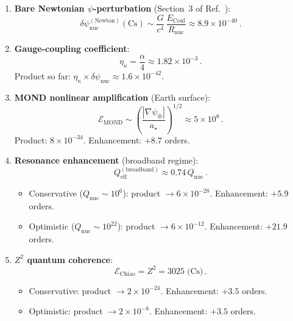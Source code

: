 \documentclass[aps,prd,twocolumn,superscriptaddress,nofootinbib]{revtex4-2}
\newcommand{\astar}{a_\star}
\newcommand{\ee}[1]{\times 10^{#1}}
\newcommand{\kap}{\kappa}
\newcommand{\dpsi}{\delta\psi}
\newcommand{\Qnuc}{Q_{\mathrm{nuc}}}
\newcommand{\Rnuc}{R_{\mathrm{nuc}}}
\newcommand{\Ecoul}{E_{\mathrm{Coul}}}
\begin{document}
\begin{enumerate}[label=\arabic*.]
\item \textbf{Bare Newtonian $\psi$-perturbation} (Section~3 of
Ref.~\cite{Alcock2026VS}):
\begin{equation}
\dpsi_{\mathrm{nuc}}^{(\mathrm{Newton})}(\mathrm{Cs})
\sim \frac{G}{c^4}\,\frac{\Ecoul}{\Rnuc}
\approx 8.9\ee{-40}\,.
\end{equation}

\item \textbf{Gauge-coupling coefficient}:
\begin{equation}
\eta_\kap = \frac{\alpha}{4} \approx 1.82\ee{-3}\,.
\end{equation}
Product so far: $\eta_\kap \times \dpsi_{\mathrm{nuc}} \approx
1.6\ee{-42}$.

\item \textbf{MOND nonlinear amplification} (Earth surface):
\begin{equation}
\mathcal{E}_{\mathrm{MOND}} \sim
\left(\frac{|\nabla\psi_\oplus|}{\astar}\right)^{1/2}
\approx 5\ee{8}\,.
\end{equation}
Product: $8\ee{-34}$.  Enhancement: $+8.7$ orders.

\item \textbf{Resonance enhancement} (broadband regime):
\begin{equation}
Q_{\mathrm{eff}}^{(\mathrm{broadband})} \approx 0.74\,\Qnuc\,.
\end{equation}
\begin{itemize}[nosep]
\item Conservative ($\Qnuc \sim 10^6$): product $\rightarrow 6\ee{-28}$.
Enhancement: $+5.9$ orders.
\item Optimistic ($\Qnuc \sim 10^{22}$): product $\rightarrow 6\ee{-12}$.
Enhancement: $+21.9$ orders.
\end{itemize}

\item \textbf{$Z^2$ quantum coherence}:
\begin{equation}
\mathcal{E}_{\mathrm{Chiao}} = Z^2 = 3025\;\text{(Cs)}\,.
\end{equation}
\begin{itemize}[nosep]
\item Conservative: product $\rightarrow 2\ee{-24}$.
Enhancement: $+3.5$ orders.
\item Optimistic: product $\rightarrow 2\ee{-8}$.
Enhancement: $+3.5$ orders.
\end{itemize}
\end{enumerate}
\end{document}
